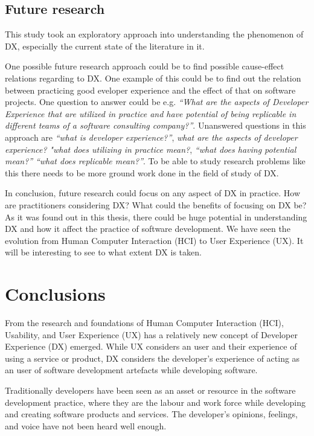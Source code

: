 \documentclass[english, 12pt, a4paper, sci, utf8, a-1b, online]{aaltothesis}
\begin{document}
\subsection{Future research}

This study took an exploratory approach into understanding the phenomenon of DX, especially the current state of the literature in it.

One possible future research approach could be to find possible cause-effect relations regarding to DX. One example of this could be to find out the relation between practicing good eveloper experience and the effect of that on software projects. One question to answer could be e.g. \textit{``What are the aspects of Developer Experience that are utilized in practice and have potential of being replicable in different teams of a software consulting company?''}. Unanswered questions in this approach are \textit{``what is developer experience?''}, \textit{what are the aspects of developer experience?} \textit{"what does utilizing in practice mean?}, \textit{``what does having potential mean?''} \textit{``what does replicable mean?''}. To be able to study research problems like this there needs to be more ground work done in the field of study of DX.

In conclusion, future research could focus on any aspect of DX in practice. How are practitioners considering DX? What could the benefits of focusing on DX be? As it was found out in this thesis, there could be huge potential in understanding DX and how it affect the practice of software development. We have seen the evolution from Human Computer Interaction (HCI) to User Experience (UX). It will be interesting to see to what extent DX is taken.

\clearpage
\section{Conclusions} \label{section:conclusions}

From the research and foundations of Human Computer Interaction (HCI), Usability, and User Experience (UX) has a relatively new concept of Developer Experience (DX) emerged. While UX considers an user and their experience of using a service or product, DX considers the developer's experience of acting as an user of software development artefacts while developing software.

Traditionally developers have been seen as an asset or resource in the software development practice, where they are the labour and work force while developing and creating software products and services. The developer's opinions, feelings, and voice have not been heard well enough.
\end{document}
